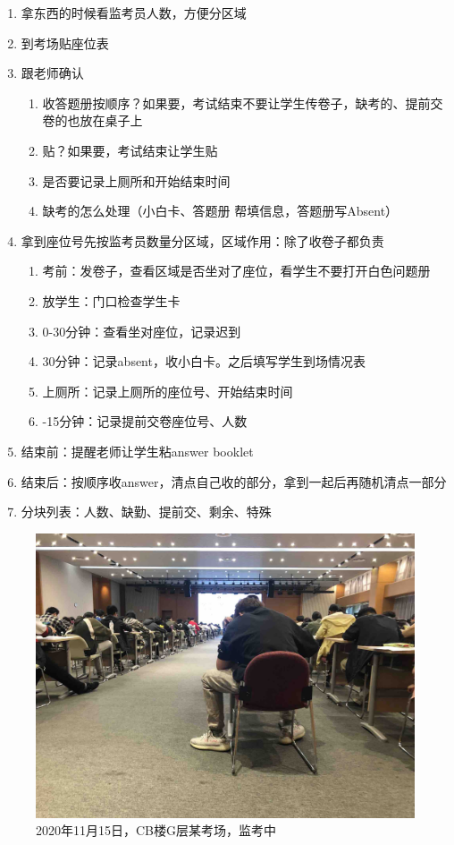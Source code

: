\begin{enumerate}
    \item 拿东西的时候看监考员人数，方便分区域
    \item 到考场贴座位表
    \item 跟老师确认
    \begin{enumerate}
        \item 收答题册按顺序？如果要，考试结束不要让学生传卷子，缺考的、提前交卷的也放在桌子上
        \item 贴？如果要，考试结束让学生贴
        \item 是否要记录上厕所和开始结束时间
        \item 缺考的怎么处理（小白卡、答题册 帮填信息，答题册写Absent）
    \end{enumerate}
    \item 拿到座位号先按监考员数量分区域，区域作用：除了收卷子都负责
    \begin{enumerate}
        \item 考前：发卷子，查看区域是否坐对了座位，看学生不要打开白色问题册
        \item 放学生：门口检查学生卡
        \item 0-30分钟：查看坐对座位，记录迟到
        \item 30分钟：记录absent，收小白卡。之后填写学生到场情况表
        \item 上厕所：记录上厕所的座位号、开始结束时间
        \item -15分钟：记录提前交卷座位号、人数
    \end{enumerate}
    \item 结束前：提醒老师让学生粘answer booklet
    \item 结束后：按顺序收answer，清点自己收的部分，拿到一起后再随机清点一部分
    \item 分块列表：人数、缺勤、提前交、剩余、特殊
\end{enumerate}


\begin{figure}[H]
    \centering
    \includegraphics[width=0.9\columnwidth]{author-folder/Kai.Wu/invigilation.jpg}
    \caption{2020年11月15日，CB楼G层某考场，监考中}
\end{figure}

